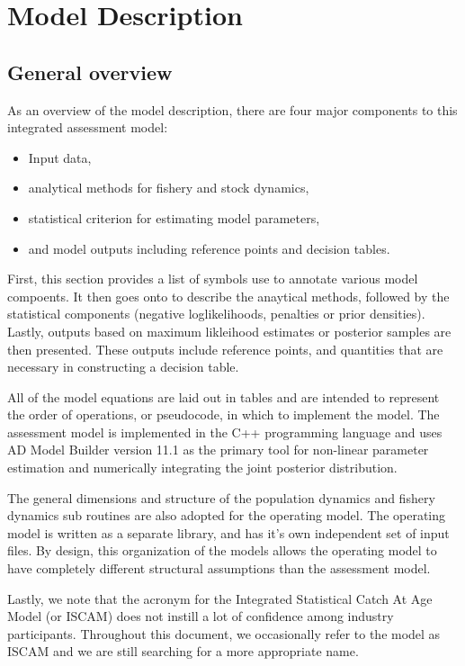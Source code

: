 \section{Model Description} %
\label{sec:model_description}

\subsection{General overview} %
\label{sub:general_overview}


As an overview of the model description, there are four major components to this integrated assessment model:
\begin{itemize}
    \item Input data,
    \item analytical methods for fishery and stock dynamics,
    \item statistical criterion for estimating model parameters,
    \item and model outputs including reference points and decision tables.
\end{itemize}

First, this section provides a list of symbols use to annotate various model compoents.  It then goes onto to describe the anaytical methods, followed by the statistical components (negative loglikelihoods, penalties or prior densities). Lastly, outputs based on maximum likleihood estimates or posterior samples are then presented.  These outputs include reference points, and quantities that are necessary in constructing a decision table.

 All of the model equations are laid out in tables and are intended to represent the order of operations, or pseudocode, in which to implement the model.  The assessment model is implemented in the C++ programming language and uses AD Model Builder version 11.1 \citep{fournier2011ad} as the primary tool for non-linear parameter estimation and numerically integrating the joint posterior distribution.  


 The general dimensions and structure of the population dynamics and fishery dynamics sub routines are also adopted for the operating model.  The operating model is written as a separate library, and has it's own independent set of input files.  By design, this organization of the models allows the operating model to have completely different structural assumptions than the assessment model.

Lastly, we note that the acronym for the Integrated Statistical Catch At Age Model (or ISCAM) does not instill a lot of confidence among industry participants.  Throughout this document, we occasionally refer to the model as ISCAM and we are still searching for a more appropriate name.

